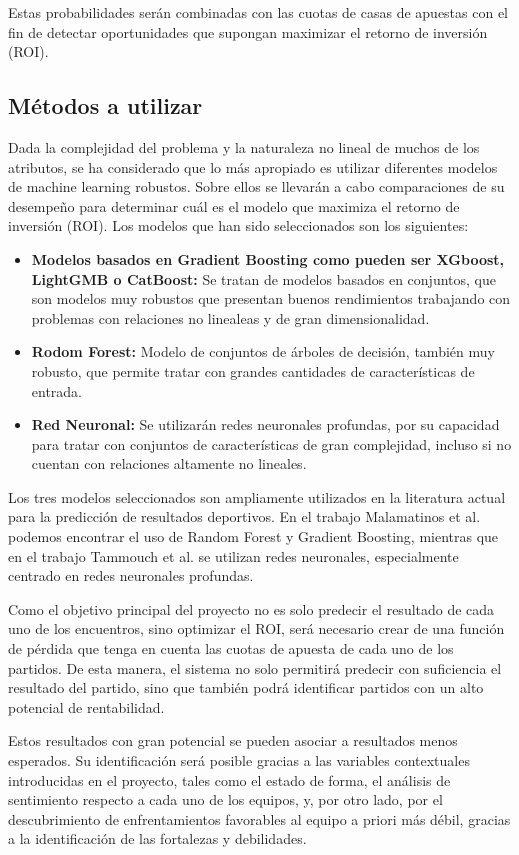 Estas probabilidades serán combinadas con las cuotas de casas de apuestas con el fin de detectar oportunidades que supongan maximizar el retorno de inversión (ROI).

\subsection{Métodos a utilizar}

Dada la complejidad del problema y la naturaleza no lineal de muchos de los atributos, se ha considerado que lo más apropiado es utilizar diferentes modelos de machine learning robustos. Sobre ellos se llevarán a cabo comparaciones de su desempeño para determinar cuál es el modelo que maximiza el retorno de inversión (ROI). Los modelos que han sido seleccionados son los siguientes:

\begin{itemize}
    \item \textbf{Modelos basados en Gradient Boosting como pueden ser XGboost, LightGMB o CatBoost:} Se tratan de modelos basados en conjuntos, que son modelos muy robustos que presentan buenos rendimientos trabajando con problemas con relaciones no linealeas y de gran dimensionalidad.
    \item \textbf{Rodom Forest:} Modelo de conjuntos de árboles de decisión, también muy robusto, que permite tratar con grandes cantidades de características de entrada.
    \item \textbf{Red Neuronal:} Se utilizarán redes neuronales profundas, por su capacidad para tratar con conjuntos de características de gran complejidad, incluso si no cuentan con relaciones altamente no lineales.
\end{itemize}

Los tres modelos seleccionados son ampliamente utilizados en la literatura actual para la predicción de resultados deportivos. En el trabajo Malamatinos et al. \cite{Malamatinos2022GreekLeague} podemos encontrar el uso de Random Forest y Gradient Boosting, mientras que en el trabajo Tammouch et al. \cite{Tammouch2024BettingML} se utilizan redes neuronales, especialmente centrado en redes neuronales profundas.

Como el objetivo principal del proyecto no es solo predecir el resultado de cada uno de los encuentros, sino optimizar el ROI, será necesario crear de una función de pérdida que tenga en cuenta las cuotas de apuesta de cada uno de los partidos. De esta manera, el sistema no solo permitirá predecir con suficiencia el resultado del partido, sino que también podrá identificar partidos con un alto potencial de rentabilidad.

Estos resultados con gran potencial se pueden asociar a resultados menos esperados. Su identificación será posible gracias a las variables contextuales introducidas en el proyecto, tales como el estado de forma, el análisis de sentimiento respecto a cada uno de los equipos, y, por otro lado, por el descubrimiento de enfrentamientos favorables al equipo a priori más débil, gracias a la identificación de las fortalezas y debilidades.